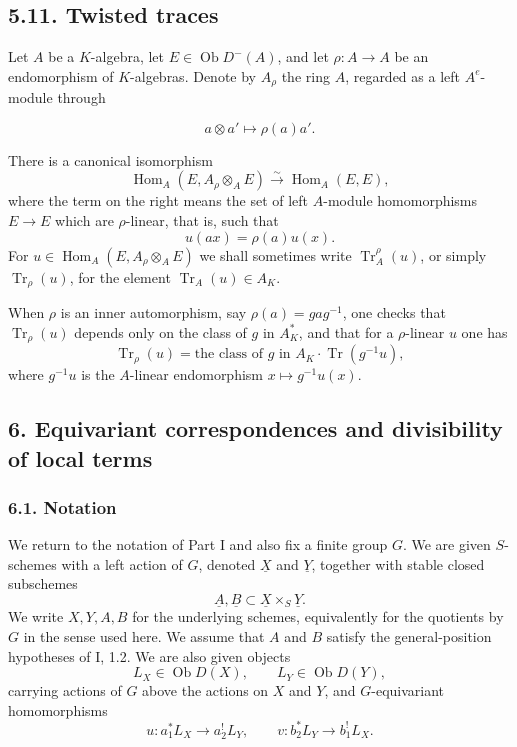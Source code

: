 \documentclass[11pt]{article}
\theoremstyle{plain}
\theoremstyle{definition}
\theoremstyle{remark}
\DeclareMathOperator{\Hom}{Hom}
\DeclareMathOperator{\ob}{Ob}
\DeclareMathOperator{\Tr}{Tr}
\begin{document}
\subsection*{5.11. Twisted traces}

Let $A$ be a $K$-algebra, let $E\in\ob D^-(A)$, and let
$\rho:A\to A$ be an endomorphism of $K$-algebras. Denote by
$A_\rho$ the ring $A$, regarded as a left $A^e$-module through

\[
   a \otimes a' \longmapsto \rho(a)a'.
\]

There is a canonical isomorphism
\[
   \Hom_A(E,A_\rho\otimes_A E)\xrightarrow{\sim}\Hom_A(E,E),
\]
where the term on the right means the set of left $A$-module homomorphisms
$E\to E$ which are $\rho$-linear, that is, such that
\[
        u(ax)=\rho(a)u(x).
\]
For $u\in\Hom_A(E,A_\rho\otimes_A E)$ we shall sometimes write
$\Tr_A^\rho(u)$, or simply $\Tr_\rho(u)$, for the element
$\Tr_A(u)\in A_K$.

When $\rho$ is an inner automorphism, say $\rho(a)=gag^{-1}$, one checks that
$\Tr_\rho(u)$ depends only on the class of $g$ in $A_K^*$, and that for a
$\rho$-linear $u$ one has
\begin{equation}\tag{5.13.1}
   \Tr_\rho(u)=\text{the class of }g\text{ in }A_K\cdot \Tr(g^{-1}u),
\end{equation}
where $g^{-1}u$ is the $A$-linear endomorphism $x\mapsto g^{-1}u(x)$.

\subsection*{6. Equivariant correspondences and divisibility of local terms}

\subsubsection*{6.1. Notation}

We return to the notation of Part I and also fix a finite group $G$. We are given
$S$-schemes with a left action of $G$, denoted $\underline X$ and
$\underline Y$, together with stable closed subschemes
\[
  \underline A,\underline B\subset \underline X\times_S\underline Y.
\]
We write $X,Y,A,B$ for the underlying schemes, equivalently for the quotients by
$G$ in the sense used here. We assume that $A$ and $B$ satisfy the general-position
hypotheses of I, 1.2. We are also given objects
\[
      L_X\in\ob D(X),\qquad L_Y\in\ob D(Y),
\]
carrying actions of $G$ above the actions on $X$ and $Y$, and $G$-equivariant
homomorphisms
\[
      u:a_1^*L_X\longrightarrow a_2^!L_Y,
      \qquad
      v:b_2^*L_Y\longrightarrow b_1^!L_X.
\]
\end{document}
